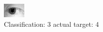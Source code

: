 \begin{figure}[h!]
\begin{center}
\includegraphics[width=0.60\columnwidth]{figures/ID1248_class_3_target_4.png}
\end{center}
\caption{ Classification: 3 actual target: 4}
\label{fig:ID1248_class_3_target_4}
\end{figure}
